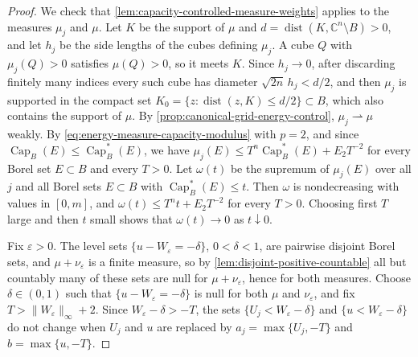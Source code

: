\begin{proof}
We check that \cref{lem:capacity-controlled-measure-weights} applies to the measures $\mu_j$ and $\mu$. Let $K$ be the support of $\mu$ and $d=\operatorname{dist}(K,\mathbb C^n\setminus B)>0$, and let $h_j$ be the side lengths of the cubes defining $\mu_j$. A cube $Q$ with $\mu_j(Q)>0$ satisfies $\mu(Q)>0$, so it meets $K$. Since $h_j\to0$, after discarding finitely many indices every such cube has diameter $\sqrt{2n}\,h_j<d/2$, and then $\mu_j$ is supported in the compact set $K_0=\{z:\operatorname{dist}(z,K)\leq d/2\}\subset B$, which also contains the support of $\mu$. By \cref{prop:canonical-grid-energy-control}, $\mu_j\rightharpoonup\mu$ weakly. By \eqref{eq:energy-measure-capacity-modulus} with $p=2$, and since $\operatorname{Cap}_B(E)\leq\operatorname{Cap}_B^*(E)$, we have $\mu_j(E)\leq T^n\operatorname{Cap}_B^*(E)+E_2T^{-2}$ for every Borel set $E\subset B$ and every $T>0$. Let $\omega(t)$ be the supremum of $\mu_j(E)$ over all $j$ and all Borel sets $E\subset B$ with $\operatorname{Cap}_B^*(E)\leq t$. Then $\omega$ is nondecreasing with values in $[0,m]$, and $\omega(t)\leq T^nt+E_2T^{-2}$ for every $T>0$. Choosing first $T$ large and then $t$ small shows that $\omega(t)\to0$ as $t\downarrow0$.

Fix $\varepsilon>0$. The level sets $\{u-W_\varepsilon=-\delta\}$, $0<\delta<1$, are pairwise disjoint Borel sets, and $\mu+\nu_\varepsilon$ is a finite measure, so by \cref{lem:disjoint-positive-countable} all but countably many of these sets are null for $\mu+\nu_\varepsilon$, hence for both measures. Choose $\delta\in(0,1)$ such that $\{u-W_\varepsilon=-\delta\}$ is null for both $\mu$ and $\nu_\varepsilon$, and fix $T>\|W_\varepsilon\|_\infty+2$. Since $W_\varepsilon-\delta>-T$, the sets $\{U_j<W_\varepsilon-\delta\}$ and $\{u<W_\varepsilon-\delta\}$ do not change when $U_j$ and $u$ are replaced by $a_j=\max\{U_j,-T\}$ and $b=\max\{u,-T\}$.


\end{proof}
